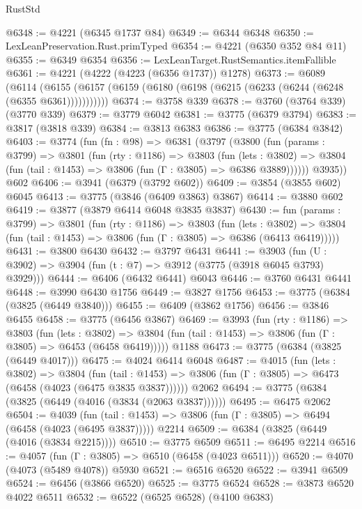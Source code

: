 \begin{lexlean}{RustStd}
\begin{coremodule}
{\begin{coremodule}
{{{{{{{{{{{{{{{{{{{{{{{{{{{{{{{@6348 := @4221 (@6345 @1737 @84)
@6349 := @6344 @6348
@6350 := LexLeanPreservation.Rust.primTyped
@6354 := @4221 (@6350 @352 @84 @11)
@6355 := @6349 @6354
@6356 := LexLeanTarget.RustSemantics.itemFallible
@6361 := @4221 (@4222 (@4223 (@6356 @1737)) @1278)
@6373 := @6089
    (@6114 (@6155 (@6157 (@6159 (@6180 (@6198 (@6215 (@6233 (@6244 (@6248 (@6355 @6361)))))))))))
@6374 := @3758 @339
@6378 := @3760 (@3764 @339) (@3770 @339)
@6379 := @3779 @6042
@6381 := @3775 (@6379 @3794)
@6383 := @3817 (@3818 @339)
@6384 := @3813 @6383
@6386 := @3775 (@6384 @3842)
@6403 := @3774
    (fun (fn : @98) =>
    @6381
      (@3797
        (@3800
          (fun (params : @3799) =>
          @3801
            (fun (rty : @1186) =>
            @3803
              (fun (lets : @3802) =>
              @3804 (fun (tail : @1453) => @3806 (fun (Γ : @3805) => @6386 @3889))))))
        @3935))
    @602
@6406 := @3941 (@6379 (@3792 @602))
@6409 := @3854 (@3855 @602) @6045
@6413 := @3775 (@3846 (@6409 @3863) @3867)
@6414 := @3880 @602
@6419 := @3877 (@3879 @6414 @6048 @3835 @3837)
@6430 := fun (params : @3799) =>
  @3801
    (fun (rty : @1186) =>
    @3803
      (fun (lets : @3802) =>
      @3804 (fun (tail : @1453) => @3806 (fun (Γ : @3805) => @6386 (@6413 @6419)))))
@6431 := @3800 @6430
@6432 := @3797 @6431
@6441 := @3903 (fun (U : @3902) => @3904 (fun (t : @7) => @3912 (@3775 (@3918 @6045 @3793) @3929)))
@6444 := @6406 (@6432 @6441) @6043
@6446 := @3760 @6431 @6441
@6448 := @3990 @6430 @1756
@6449 := @3827 @1756
@6453 := @3775 (@6384 (@3825 (@6449 @3840)))
@6455 := @6409 (@3862 @1756)
@6456 := @3846 @6455
@6458 := @3775 (@6456 @3867)
@6469 := @3993
    (fun (rty : @1186) =>
    @3803
      (fun (lets : @3802) =>
      @3804 (fun (tail : @1453) => @3806 (fun (Γ : @3805) => @6453 (@6458 @6419)))))
    @1188
@6473 := @3775 (@6384 (@3825 (@6449 @4017)))
@6475 := @4024 @6414 @6048
@6487 := @4015
    (fun (lets : @3802) =>
    @3804
      (fun (tail : @1453) => @3806 (fun (Γ : @3805) => @6473 (@6458 (@4023 (@6475 @3835 @3837))))))
    @2062
@6494 := @3775 (@6384 (@3825 (@6449 (@4016 (@3834 (@2063 @3837))))))
@6495 := @6475 @2062
@6504 := @4039
    (fun (tail : @1453) => @3806 (fun (Γ : @3805) => @6494 (@6458 (@4023 (@6495 @3837)))))
    @2214
@6509 := @6384 (@3825 (@6449 (@4016 (@3834 @2215))))
@6510 := @3775 @6509
@6511 := @6495 @2214
@6516 := @4057 (fun (Γ : @3805) => @6510 (@6458 (@4023 @6511)))
@6520 := @4070 (@4073 (@5489 @4078)) @5930
@6521 := @6516 @6520
@6522 := @3941 @6509
@6524 := @6456 (@3866 @6520)
@6525 := @3775 @6524
@6528 := @3873 @6520 @4022 @6511
@6532 := @6522 (@6525 @6528) (@4100 @6383)
}}}}}}}}}}}}}}}}}}}}}}}}}}}}}}}
\end{coremodule}}
\end{coremodule}
\end{lexlean}

